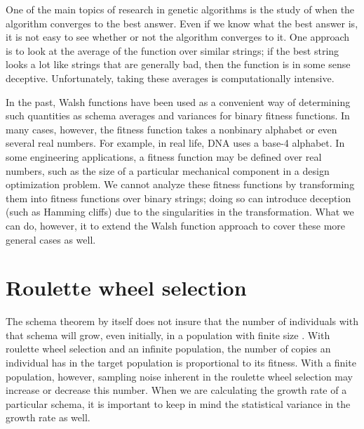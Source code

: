 
One of the main topics of research in genetic algorithms is the study of
when the algorithm converges to the best answer.  Even if we know what
the best answer is, it is not easy to see whether or not the algorithm
converges to it.  One approach is to look at the average of the function
over similar strings; if the best string looks a lot like strings that
are generally bad, then the function is in some sense deceptive.
Unfortunately, taking these averages is computationally intensive.

In the past, Walsh functions have been used as a convenient way of
determining such quantities as schema averages and variances for binary
fitness functions.  In many cases, however, the fitness function takes a
nonbinary alphabet or even several real numbers.  For example, in real life,
DNA uses a base-4 alphabet.  In some engineering applications, a fitness
function may be defined over real numbers, such as the size of a particular
mechanical component in a design optimization problem.  We cannot analyze
these fitness functions by transforming them into fitness functions over
binary strings; doing so can introduce deception (such as Hamming cliffs)
due to the singularities in the transformation.  What we can do, however,
it to extend the Walsh function approach to cover these more general
cases as well.

\section{Roulette wheel selection}
The schema theorem \cite{bible} by itself does not insure that the number of
individuals with that schema will grow, even initially, in a population
with finite size \cite{variance}.  With roulette wheel selection and an
infinite population, the number of copies an individual has in the target
population is proportional to its fitness.  With a finite population, however,
sampling noise inherent in the roulette wheel selection may increase or
decrease this number.  When we are calculating the growth rate of a
particular schema, it is important to keep in mind the statistical variance
in the growth rate as well.



